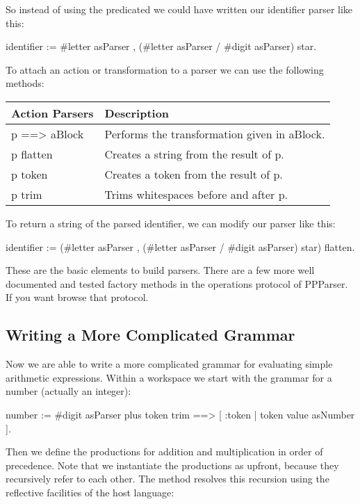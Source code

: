 \documentclass[a4paper,10pt,twoside]{book}
\begin{document}
So instead of using the  predicated we could have written
our identifier parser like this:

\begin{code}{}
identifier := #letter asParser , (#letter asParser / #digit asParser) star.
\end{code}

To attach an action or transformation to a parser we can use the following methods:

\begin{tabular}{ll}
\textbf{Action Parsers} & 	\textbf{Description}\\
\midrule
p ==> aBlock & 	Performs the transformation given in aBlock.\\
p flatten    & 	Creates a string from the result of p.\\
p token      &	Creates a token from the result of p.\\
p trim       &	Trims whitespaces before and after p.
\end{tabular}

To return a string of the parsed identifier, we can modify our parser
like this:

\begin{code}{}
identifier := (#letter asParser , (#letter asParser / #digit asParser) star) flatten.
\end{code}

These are the basic elements to build parsers. There are a few more
well documented and tested factory methods in the operations protocol
of PPParser. If you want browse that protocol.

\subsection{Writing a More Complicated Grammar}

Now we are able to write a more complicated grammar for evaluating
simple arithmetic expressions. Within a workspace we start with the
grammar for a number (actually an integer):

\begin{code}{}
number :=  #digit asParser plus token trim ==> [ :token | token value asNumber ].
\end{code}

Then we define the productions for addition and multiplication in
order of precedence. Note that we instantiate the productions as
 upfront, because they recursively refer to
each other. The method  resolves this recursion using the
reflective facilities of the host language:
\end{document}
